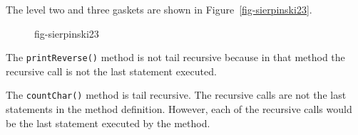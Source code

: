 \begin{ANS}
\item  The level two and three gaskets are shown in Figure~\ref{fig-sierpinski23}.

\begin{figure}[tb]
{fig-sierpinski23}
\end{figure}

\item  The {\tt printReverse()} method is not tail recursive because in that
method the recursive call is not the last statement executed.

\item  The {\tt countChar()} method is tail recursive.  The recursive calls
are not the last statements in the method definition.  However, each of
the recursive calls would be the last statement executed by the
method.

\end{ANS}

\label{exercises}

